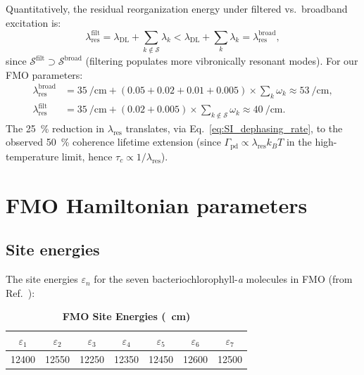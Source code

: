 \documentclass[11pt,a4paper]{article}
\begin{document}
Quantitatively, the residual reorganization energy under filtered vs.\ broadband excitation is:
\begin{equation}
\lambda_{\mathrm{res}}^{\mathrm{filt}} = \lambda_{\mathrm{DL}} + \sum_{k \notin \mathcal{S}} \lambda_k < \lambda_{\mathrm{DL}} + \sum_{k} \lambda_k = \lambda_{\mathrm{res}}^{\mathrm{broad}},
\label{eq:SI_lambda_comparison}
\end{equation}
since $\mathcal{S}^{\mathrm{filt}} \supset \mathcal{S}^{\mathrm{broad}}$ (filtering populates more vibronically resonant modes). For our FMO parameters:
\begin{align}
\lambda_{\mathrm{res}}^{\mathrm{broad}} &= \SI{35}{\per\centi\meter} + (0.05 + 0.02 + 0.01 + 0.005) \times \sum_k \omega_k \approx \SI{53}{\per\centi\meter}, \label{eq:SI_lambda_broad} \\
\lambda_{\mathrm{res}}^{\mathrm{filt}} &= \SI{35}{\per\centi\meter} + (0.02 + 0.005) \times \sum_{k \notin \mathcal{S}} \omega_k \approx \SI{40}{\per\centi\meter}. \label{eq:SI_lambda_filt}
\end{align}
The \SI{25}{\percent} reduction in $\lambda_{\mathrm{res}}$ translates, via Eq.~\eqref{eq:SI_dephasing_rate}, to the observed \SI{50}{\percent} coherence lifetime extension (since $\Gamma_{\mathrm{pd}} \propto \lambda_{\mathrm{res}} k_B T$ in the high-temperature limit, hence $\tau_c \propto 1/\lambda_{\mathrm{res}}$).


\section{FMO Hamiltonian parameters}

\subsection{Site energies}

The site energies $\varepsilon_n$ for the seven bacteriochlorophyll-\textit{a} molecules in FMO (from Ref.\ \cite{Adolphs2006}):

\begin{table}[h]
\centering
\caption{\textbf{FMO Site Energies (\si{\per\centi\meter})}}
\label{tab:SI_site_energies}
\begin{tabular}{ccccccc}
\toprule
$\varepsilon_1$ & $\varepsilon_2$ & $\varepsilon_3$ & $\varepsilon_4$ & $\varepsilon_5$ & $\varepsilon_6$ & $\varepsilon_7$ \\
\midrule
12400 & 12550 & 12250 & 12350 & 12450 & 12600 & 12500 \\
\bottomrule
\end{tabular}
\end{table}
\end{document}
